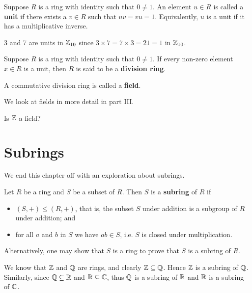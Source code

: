 \begin{definition}
    Suppose $R$ is a ring with identity such that $0 \neq 1$. An element $u \in R$ is called a \textbf{unit} if there exists a $v \in R$ such that $uv=vu=1$. Equivalently, $u$ is a unit if it has a multiplicative inverse.
\end{definition}
\begin{example}
    3 and 7 are units in $\mathbb{Z}_{10}$ since $3 \times 7 = 7 \times 3 = 21 = 1$ in $\mathbb{Z}_{10}$.
\end{example}

\begin{definition}
    Suppose $R$ is a ring with identity such that $0 \neq 1$. If every non-zero element $x \in R$ is a unit, then $R$ is said to be a \textbf{division ring}.
\end{definition}

\begin{definition}
    A commutative division ring is called a \textbf{field}.
\end{definition}
We look at fields in more detail in part III.

\begin{exercise}\label{exercise-Z-is-not-a-field}
    Is $\mathbb{Z}$ a field?
\end{exercise}

\section{Subrings}
We end this chapter off with an exploration about subrings.

\begin{definition}
    Let $R$ be a ring and $S$ be a subset of $R$. Then $S$ is a \textbf{subring} of $R$ if
    \begin{itemize}
        \item $(S, +) \leq (R, +)$, that is, the subset $S$ under addition is a subgroup of $R$ under addition; and
        \item for all $a$ and $b$ in $S$ we have $ab \in S$, i.e. $S$ is closed under multiplication.
    \end{itemize}
\end{definition}
\begin{remark}
    Alternatively, one may show that $S$ is a ring to prove that $S$ is a subring of $R$.
\end{remark}

\begin{example}
    We know that $\mathbb{Z}$ and $\mathbb{Q}$ are rings, and clearly $\mathbb{Z} \subseteq \mathbb{Q}$. Hence $\mathbb{Z}$ is a subring of $\mathbb{Q}$. Similarly, since $\mathbb{Q} \subseteq \mathbb{R}$ and $\mathbb{R} \subseteq \mathbb{C}$, thus $\mathbb{Q}$ is a subring of $\mathbb{R}$ and $\mathbb{R}$ is a subring of $\mathbb{C}$.
\end{example}

